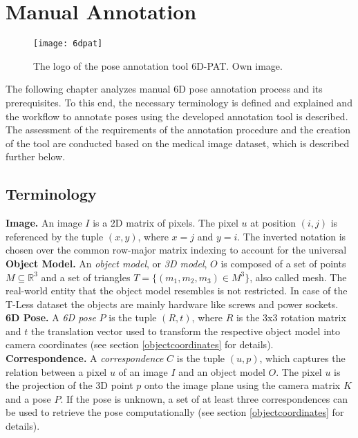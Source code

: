 \chapter{Manual Annotation} \label{chapter:manual_annotation}

\begin{figure}[!tbp]
	\centering
    \texttt{[image: 6dpat]}
    \caption{The logo of the pose annotation tool 6D-PAT. Own image.}
    	\label{fig:6dpat_logo}
\end{figure} 

The following chapter analyzes manual 6D pose annotation process and its prerequisites. To this end, the necessary terminology is defined and explained and the workflow to annotate poses using the developed annotation tool is described. The assessment of the requirements of the annotation procedure and the creation of the tool are conducted based on the medical image dataset, which is described further below.

\section{Terminology} \label{section:terminology}

\textbf{Image.} An image $I$ is a 2D matrix of pixels. The pixel $u$ at position $(i, j)$ is referenced by the tuple $(x, y)$, where $x = j$ and $y = i$. The inverted notation is chosen over the common row-major matrix indexing to account for the universal  \\

\noindent\textbf{Object Model.} An \textit{object model}, or \textit{3D model}, $O$ is composed of a set of points $M \subseteq \mathbb{R}^3$ and a set of triangles $T = \{(m_1, m_2, m_3) \in M^3\}$, also called mesh. The real-world entity that the object model resembles is not restricted. In case of the T-Less dataset \cite{tless} the objects are mainly hardware like screws and power sockets. \\

\noindent\textbf{6D Pose.} A \textit{6D pose} $P$ is the tuple $(R, t)$, where $R$ is the 3x3 rotation matrix and $t$ the translation vector used to transform the respective object model into camera coordinates (see section \ref{objectcoordinates} for details). \\

\noindent\textbf{Correspondence.} A \textit{correspondence} $C$ is the tuple $(u, p)$, which captures the relation between a pixel $u$ of an image $I$ and an object model $O$. The pixel $u$ is the projection of the 3D point $p$ onto the image plane using the camera matrix $K$ and a pose $P$. If the pose is unknown, a set of at least three correspondences can be used to retrieve the pose computationally (see section \ref{objectcoordinates} for details). \\

